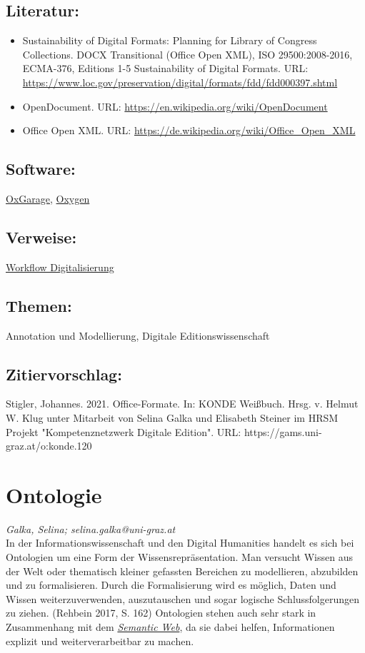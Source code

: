 \documentclass{article}
\begin{document}
        \subsection*{Literatur:}\begin{itemize}\item Sustainability of Digital Formats: Planning for Library of Congress Collections. DOCX Transitional (Office Open XML), ISO 29500:2008-2016, ECMA-376, Editions 1-5 Sustainability of Digital Formats. URL: \url{https://www.loc.gov/preservation/digital/formats/fdd/fdd000397.shtml}\item OpenDocument. URL: \url{https://en.wikipedia.org/wiki/OpenDocument}\item Office Open XML. URL: \url{https://de.wikipedia.org/wiki/Office_Open_XML}\end{itemize}\subsection*{Software:}\href{https://oxgarage.tei-c.org/}{OxGarage}, \href{http://oxygenxml.com/}{Oxygen}\subsection*{Verweise:}\href{https://gams.uni-graz.at/archive/objects/context:konde/methods/sdef:Context/get?mode=workflow}{Workflow Digitalisierung}\subsection*{Themen:}Annotation und Modellierung, Digitale Editionswissenschaft\subsection*{Zitiervorschlag:}Stigler, Johannes. 2021. Office-Formate. In: KONDE Weißbuch. Hrsg. v. Helmut W. Klug unter Mitarbeit von Selina Galka und Elisabeth Steiner im HRSM Projekt "Kompetenznetzwerk Digitale Edition". URL: https://gams.uni-graz.at/o:konde.120\newpage\section*{Ontologie} \emph{Galka, Selina; selina.galka@uni-graz.at }\\
        
    In der Informationswissenschaft und den Digital Humanities handelt es sich bei Ontologien um eine Form der Wissensrepräsentation. Man versucht Wissen aus der Welt oder thematisch kleiner gefassten Bereichen zu modellieren, abzubilden und zu formalisieren. Durch die Formalisierung wird es möglich, Daten und Wissen weiterzuverwenden, auszutauschen und sogar logische Schlussfolgerungen zu ziehen. (Rehbein 2017, S. 162) Ontologien stehen auch sehr stark in Zusammenhang mit dem \emph{\href{http://gams.uni-graz.at/o:konde.167}{Semantic Web}}, da sie dabei helfen, Informationen explizit  und weiterverarbeitbar zu machen.\\
            
\end{document}
